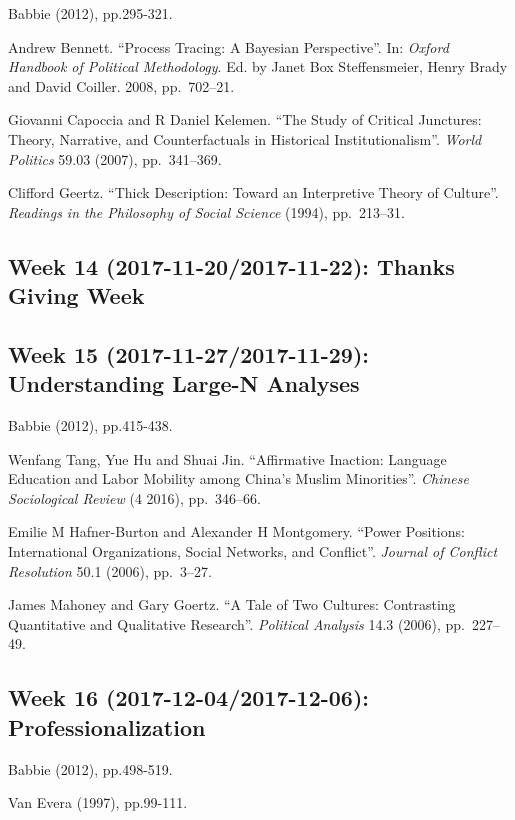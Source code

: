 \documentclass[11pt,]{article}
\theoremstyle{definition}
\theoremstyle{definition}
\theoremstyle{remark}
\begin{document}
Babbie (2012), pp.295-321.

Andrew Bennett. ``Process Tracing: A Bayesian Perspective''. In:
\emph{Oxford Handbook of Political Methodology}. Ed. by Janet Box
Steffensmeier, Henry Brady and David Coiller. 2008, pp.~702--21.

Giovanni Capoccia and R Daniel Kelemen. ``The Study of Critical
Junctures: Theory, Narrative, and Counterfactuals in Historical
Institutionalism''. \emph{World Politics} 59.03 (2007), pp.~341--369.

Clifford Geertz. ``Thick Description: Toward an Interpretive Theory of
Culture''. \emph{Readings in the Philosophy of Social Science} (1994),
pp.~213--31.

\subsection{Week 14 (2017-11-20/2017-11-22): Thanks Giving
Week}\label{week-14-2017-11-202017-11-22-thanks-giving-week}

\subsection{Week 15 (2017-11-27/2017-11-29): Understanding Large-N
Analyses}\label{week-15-2017-11-272017-11-29-understanding-large-n-analyses}

Babbie (2012), pp.415-438.

Wenfang Tang, Yue Hu and Shuai Jin. ``Affirmative Inaction: Language
Education and Labor Mobility among China's Muslim Minorities''.
\emph{Chinese Sociological Review} (4 2016), pp.~346--66.

Emilie M Hafner-Burton and Alexander H Montgomery. ``Power Positions:
International Organizations, Social Networks, and Conflict''.
\emph{Journal of Conflict Resolution} 50.1 (2006), pp.~3--27.

James Mahoney and Gary Goertz. ``A Tale of Two Cultures: Contrasting
Quantitative and Qualitative Research''. \emph{Political Analysis} 14.3
(2006), pp.~227--49.

\subsection{Week 16 (2017-12-04/2017-12-06):
Professionalization}\label{week-16-2017-12-042017-12-06-professionalization}

Babbie (2012), pp.498-519.

Van Evera (1997), pp.99-111.
\end{document}
